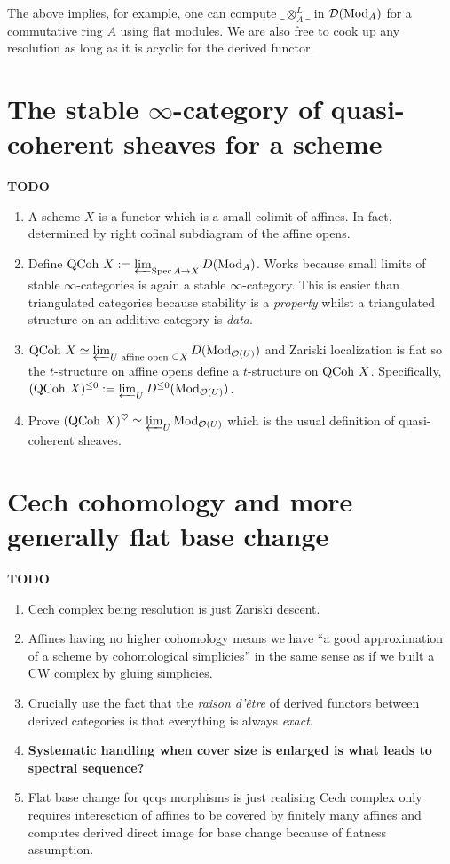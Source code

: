 \documentclass{article}
\begin{document}
The above implies, for example,
one can compute $\_ \otimes_A^L \_$ in $\mathcal{D}(\mathrm{Mod}_A)$ for a commutative ring $A$
using flat modules.
We are also free to cook up any resolution as long as
it is acyclic for the derived functor.

\section{The stable $\infty$-category of quasi-coherent sheaves for a scheme}

\textbf{TODO}
\begin{enumerate}
  \item A scheme $X$ is a functor which is a small colimit of affines.
  In fact, determined by right cofinal subdiagram of the affine opens.
  \item Define $\operatorname{QCoh}\,X := \varprojlim_{\operatorname{Spec} A \to X} D(\mathrm{Mod}_A)$.
  Works because small limits of stable $\infty$-categories is
  again a stable $\infty$-category.
  This is easier than triangulated categories 
  because stability is a \emph{property}
  whilst a triangulated structure on an additive category is \emph{data}.
  \item $\operatorname{QCoh}\,X \simeq \varprojlim_{U \text{ affine open }\subseteq X} D(\mathrm{Mod}_{\mathcal{O}(U)})$
  and Zariski localization is flat so the $t$-structure 
  on affine opens define a $t$-structure on $\operatorname{QCoh}\,X$.
  Specifically, $(\operatorname{QCoh}\,X)^{\leq 0} := \varprojlim_{U} D^{\leq 0}(\mathrm{Mod}_{\mathcal{O}(U)})$.
  \item Prove $(\operatorname{QCoh} \,X)^\heartsuit \simeq \varprojlim_{U} \mathrm{Mod}_{\mathcal{O}(U)}$
  which is the usual definition of quasi-coherent sheaves.
\end{enumerate}

\section{Cech cohomology and more generally flat base change}

\textbf{TODO}
\begin{enumerate}
  \item Cech complex being resolution is just Zariski descent.
  \item Affines having no higher cohomology
  means we have ``a good approximation of a scheme
  by cohomological simplicies'' in the same sense
  as if we built a CW complex by gluing simplicies.
  \item Crucially use the fact that the \emph{raison d'être}
  of derived functors between derived categories is that
  everything is always \emph{exact}.
  \item \textbf{Systematic handling when cover size is enlarged
  is what leads to spectral sequence?}
  \item Flat base change for qcqs morphisms is just realising
  Cech complex only requires interesction of affines to be 
  covered by finitely many affines and computes derived direct image
  for base change because of flatness assumption.
\end{enumerate}

\printbibliography
\end{document}
